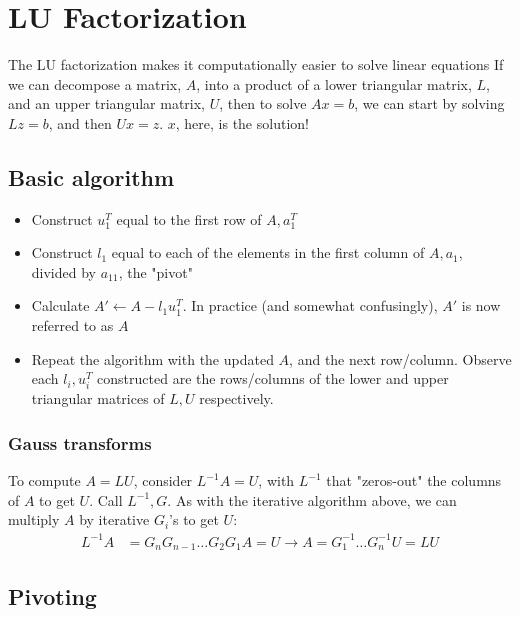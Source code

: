 \documentclass{article}
\begin{document}
\section{LU Factorization}
The LU factorization makes it computationally easier to solve linear equations If we can decompose a matrix, $A$, into a product of a lower triangular matrix, $L$, and an upper triangular matrix, $U$, then to solve $Ax=b$, we can start by solving $Lz=b$, and then $Ux=z$. $x$, here, is the solution!

\subsection{Basic algorithm}
\begin{itemize}
    \item Construct $u_1^T$ equal to the first row of $A, a_1^T$
    \item Construct $l_1$ equal to each of the elements in the first column of $A, a_1$, divided by $a_{11}$, the "pivot"
    \item Calculate $A' \leftarrow A - l_1u_1^T$. In practice (and somewhat confusingly), $A'$ is now referred to as $A$
    \item Repeat the algorithm with the updated $A$, and the next row/column. Observe each $l_i, u_i^T$ constructed are the rows/columns of the lower and upper triangular matrices of $L, U$ respectively.
\end{itemize}

\subsubsection{Gauss transforms}
To compute $A=LU$, consider $L^{-1}A = U$, with $L^{-1}$ that "zeros-out" the columns of $A$ to get $U$. Call $L^{-1}, G$. As with the iterative algorithm above, we can multiply $A$ by iterative $G_i$'s to get $U$:
\begin{align*}
    L^{-1}A &= G_nG_{n-1}\dots G_2G_1A = U  \longrightarrow A = G_1^{-1}\dots G_n^{-1}U = LU
\end{align*}


\subsection{Pivoting}
\end{document}
